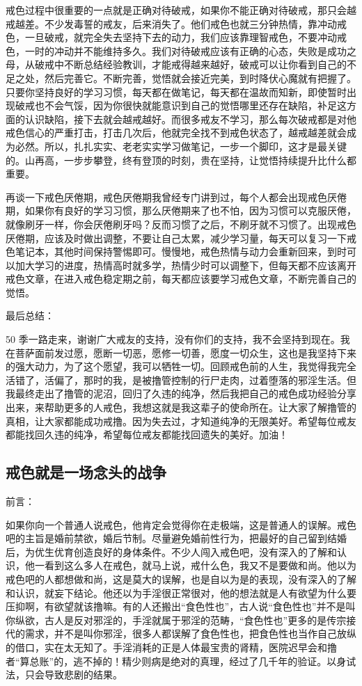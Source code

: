\documentclass{ctexart}
\begin{document}
戒色过程中很重要的一点就是正确对待破戒，如果你不能正确对待破戒，那只会越戒越差。不少发毒誓的戒友，后来消失了。他们戒色也就三分钟热情，靠冲动戒色，一旦破戒，就完全失去坚持下去的动力，我们应该靠理智戒色，不要冲动戒色，一时的冲动并不能维持多久。我们对待破戒应该有正确的心态，失败是成功之母，从破戒中不断总结经验教训，才能戒得越来越好，破戒可以让你看到自己的不足之处，然后完善它。不断完善，觉悟就会接近完美，到时降伏心魔就有把握了。只要你坚持良好的学习习惯，每天都在做笔记，每天都在温故而知新，即使暂时出现破戒也不会气馁，因为你很快就能意识到自己的觉悟哪里还存在缺陷，补足这方面的认识缺陷，接下去就会越戒越好。而很多戒友不学习，那么每次破戒都是对他戒色信心的严重打击，打击几次后，他就完全找不到戒色状态了，越戒越差就会成为必然。所以，扎扎实实、老老实实学习做笔记，一步一个脚印，这才是最关键的。山再高，一步步攀登，终有登顶的时刻，贵在坚持，让觉悟持续提升比什么都重要。

再谈一下戒色厌倦期，戒色厌倦期我曾经专门讲到过，每个人都会出现戒色厌倦期，如果你有良好的学习习惯，那么厌倦期来了也不怕，因为习惯可以克服厌倦，就像刷牙一样，你会厌倦刷牙吗？反而习惯了之后，不刷牙就不习惯了。出现戒色厌倦期，应该及时做出调整，不要让自己太累，减少学习量，每天可以复习一下戒色笔记本，其他时间保持警惕即可。慢慢地，戒色热情与动力会重新回来，到时可以加大学习的进度，热情高时就多学，热情少时可以调整下，但每天都不应该离开戒色文章，在进入戒色稳定期之前，每天都应该要学习戒色文章，不断完善自己的觉悟。

最后总结：

50 季一路走来，谢谢广大戒友的支持，没有你们的支持，我不会坚持到现在。我在菩萨面前发过愿，愿断一切恶，愿修一切善，愿度一切众生，这也是我坚持下来的强大动力，为了这个愿望，我可以牺牲一切。回顾戒色前的人生，我觉得我完全活错了，活偏了，那时的我，是被撸管控制的行尸走肉，过着堕落的邪淫生活。但我最终走出了撸管的泥沼，回归了久违的纯净，然后我把自己的戒色成功经验分享出来，来帮助更多的人戒色，我想这就是我这辈子的使命所在。让大家了解撸管的真相，让大家都能成功戒撸。因为失去过，才知道纯净的无限美好。希望每位戒友都能找回久违的纯净，希望每位戒友都能找回遗失的美好。加油！

\subsection{戒色就是一场念头的战争}

前言：

如果你向一个普通人说戒色，他肯定会觉得你在走极端，这是普通人的误解。戒色吧的主旨是婚前禁欲，婚后节制。尽量避免婚前性行为，把最好的自己留到结婚后，为优生优育创造良好的身体条件。不少人闯入戒色吧，没有深入的了解和认识，他一看到这么多人在戒色，就马上说，戒什么色，我又不是要做和尚。他以为戒色吧的人都想做和尚，这是莫大的误解，也是自以为是的表现，没有深入的了解和认识，就妄下结论。他还以为手淫很正常很对，他的想法就是人有欲望为什么要压抑啊，有欲望就该撸嘛。有的人还搬出“食色性也”，古人说“食色性也”并不是叫你纵欲，古人是反对邪淫的，手淫就属于邪淫的范畴，“食色性也”更多的是传宗接代的需求，并不是叫你邪淫，很多人都误解了食色性也，把食色性也当作自己放纵的借口，实在太无知了。手淫消耗的正是人体最宝贵的肾精，医院迟早会和撸者“算总账”的，逃不掉的！精少则病是绝对的真理，经过了几千年的验证。以身试法，只会导致悲剧的结果。
\end{document}
